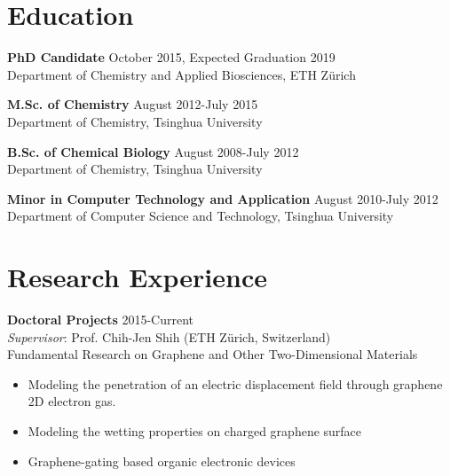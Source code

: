 \documentclass[margin]{res}
\begin{document}


\address{ HCI D120 \\
          Vladimir-Prelog-Weg 1/5 \\
          ETH Z\"{u}rich, CH-8093, Z\"{u}rich, Switzerland \\
          +41-44-63-37330 \\
          Mail: tian.tian@chem.ethz.ch}
\address{{} \\  \\  \\
        }

\begin{resume}


\section{Education}

\textbf{PhD Candidate} \hfill October 2015, Expected Graduation 2019\\
Department of Chemistry and Applied Biosciences, ETH Z\"{u}rich

\textbf{M.Sc. of Chemistry}  \hfill August 2012-July 2015\\
Department of Chemistry, Tsinghua University

\textbf{B.Sc. of Chemical Biology}  \hfill August 2008-July 2012\\
Department of Chemistry, Tsinghua University

\textbf{Minor in Computer Technology and Application}  \hfill August 2010-July 2012\\
Department of Computer Science and Technology, Tsinghua University

\section{Research Experience}
\textbf{Doctoral Projects} \hfill 2015-Current\\
\textit{Supervisor}: Prof. Chih-Jen Shih (ETH Z\"{u}rich, Switzerland)\\
Fundamental Research on Graphene and Other Two-Dimensional Materials
\begin{itemize} \itemsep -2pt
  \item Modeling the penetration of an electric displacement field through graphene 2D electron gas.
  \item Modeling the wetting properties on charged graphene surface
  \item Graphene-gating based organic electronic devices
\end{itemize}


\end{resume}
\end{document}
